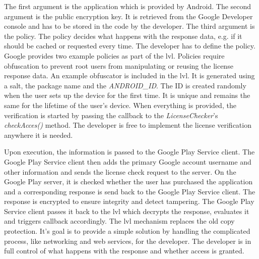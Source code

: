The first argument is the application which is provided by Android.
The second argument is the public encryption key.
It is retrieved from the Google Developer console and has to be stored in the code by the developer.
The third argument is the policy.
The policy decides what happens with the response data, e.g. if it should be cached or requested every time.
The developer has to define the policy.
Google provides two example policies as part of the \gls{lvl}.
Policies require obfuscation to prevent root users from manipulating or reusing the license response data.
An example obfuscator is included in the \gls{lvl}.
It is generated using a salt, the package name and the \textit{ANDROID\_ID}.
The ID is created randomly when the user sets up the device for the first time.
It is unique and remains the same for the lifetime of the user's device.
When everything is provided, the verification is started by passing  the callback to the \textit{LicenseChecker}'s \textit{checkAcces()} method.
The developer is free to implement the license verification anywhere it is needed.
\cite{developersLicensingOverview} \cite{developersLicensingSetup} \cite{developersLicensingAdding} \cite{digipomLvl}
\newline

Upon execution, the information is passed to the Google Play Service client.
The Google Play Service client then adds the primary Google account username and other information and sends the license check request to the server.
On the Google Play server, it is checked whether the user has purchased the application and a corresponding response is send back to the Google Play Service client.
The response is encrypted to ensure integrity and detect tampering.
The Google Play Service client passes it back to the \gls{lvl} which decrypts the response, evaluates it and triggers callback accordingly. \cite{developersLicensingOverview} \cite{developersLicensingSetup} \cite{developersLicensingAdding} \cite{digipomLvl}
\newline
The \gls{lvl} mechanism replaces the old copy protection.
It's goal is to provide a simple solution by handling the complicated process, like networking and web services, for the developer.
The developer is in full control of what happens with the response and whether access is granted.
